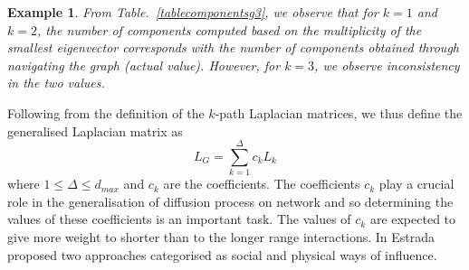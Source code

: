 \documentclass[10pt,a4paper]{article}
\newtheorem{exa}{Example}
\begin{document}
\begin{exa}
    	    	From Table.~\ref{tablecomponentsg3}, we observe that for $k=1$ and $k=2$, the number of components computed based on the multiplicity of the smallest eigenvector corresponds with the number of components obtained through navigating the graph (actual value). However, for $k=3$, we observe inconsistency in the two values.
    	    \end{exa}
    	    
    	    Following from the definition of the $k$-path Laplacian matrices, we thus define the generalised Laplacian matrix as
    	    \begin{equation}
    	    L_{G} = \sum_{k=1}^{\Delta} c_{k}L_{k}
    	    \end{equation}
			where $1 \leq \Delta \leq d_{max}$ and $c_k$ are the coefficients.
		    The coefficients $c_k$ play a crucial role in the generalisation of diffusion process on network and so determining the values of these coefficients is an important task. The values of $c_k$ are expected to give more weight to shorter than to the longer range interactions. In \citep{estrada2012path} Estrada proposed two approaches categorised as social and physical ways of influence.
		    
\end{document}
